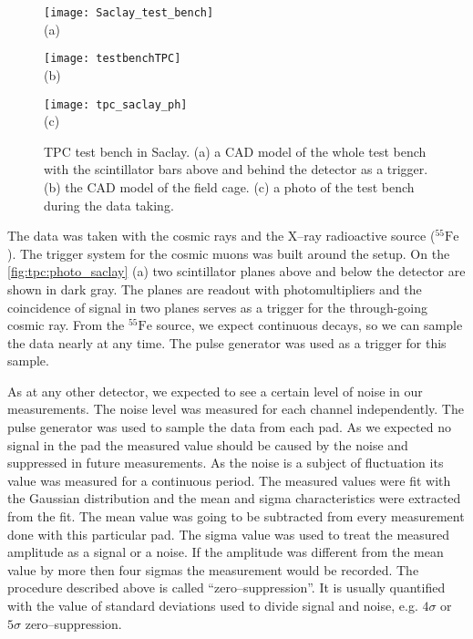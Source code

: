 \documentclass[../main.tex]{subfiles}
\begin{document}
\begin{figure}
  \begin{minipage}{0,33\linewidth}
    \centering
    \texttt{[image: Saclay\_test\_bench]} \\ (a)
  \end{minipage}
  \begin{minipage}{0,33\linewidth}
    \centering
    \texttt{[image: testbenchTPC]} \\ (b)
  \end{minipage}
  \begin{minipage}{0.33\linewidth}
    \centering
    \texttt{[image: tpc\_saclay\_ph]} \\ (c)
  \end{minipage}
  \caption{TPC test bench in Saclay. (a) a CAD model of the whole test bench with the scintillator bars above and behind the detector as a trigger. (b) the CAD model of the field cage. (c) a photo of the test bench during the data taking.}
  \label{fig:tpc:photo_saclay}
\end{figure}

The data was taken with the cosmic rays and the X--ray radioactive source (${}^{55}\text{Fe}$). The trigger system for the cosmic muons was built around the setup. On the \autoref{fig:tpc:photo_saclay} (a) two scintillator planes above and below the detector are shown in dark gray. The planes are readout with photomultipliers and the coincidence of signal in two planes serves as a trigger for the through-going cosmic ray. From the ${}^{55}\text{Fe}$ source, we expect continuous decays, so we can sample the data nearly at any time. The pulse generator was used as a trigger for this sample.

As at any other detector, we expected to see a certain level of noise in our measurements. The noise level was measured for each channel independently. The pulse generator was used to sample the data from each pad. As we expected no signal in the pad the measured value should be caused by the noise and suppressed in future measurements. As the noise is a subject of fluctuation its value was measured for a continuous period. The measured values were fit with the Gaussian distribution and the mean and sigma characteristics were extracted from the fit. The mean value was going to be subtracted from every measurement done with this particular pad. The sigma value was used to treat the measured amplitude as a signal or a noise. If the amplitude was different from the mean value by more then four sigmas the measurement would be recorded. The procedure described above is called ``zero--suppression''. It is usually quantified with the value of standard deviations used to divide signal and noise, e.g. $4\sigma$ or $5\sigma$ zero--suppression.
\end{document}
